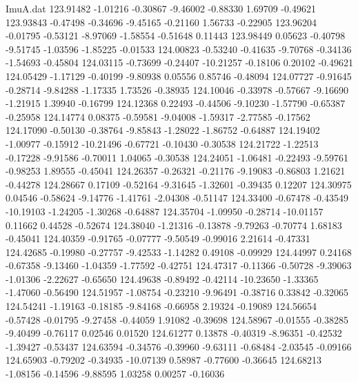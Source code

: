 \begin{filecontents}{ImuA.dat}
 123.91482   -1.01216   -0.30867   -9.46002   -0.88330    1.69709   -0.49621
 123.93843   -0.47498   -0.34696   -9.45165   -0.21160    1.56733   -0.22905
 123.96204   -0.01795   -0.53121   -8.97069   -1.58554   -0.51648    0.11443
 123.98449    0.05623   -0.40798   -9.51745   -1.03596   -1.85225   -0.01533
 124.00823   -0.53240   -0.41635   -9.70768   -0.34136   -1.54693   -0.45804
 124.03115   -0.73699   -0.24407  -10.21257   -0.18106    0.20102   -0.49621
 124.05429   -1.17129   -0.40199   -9.80938    0.05556    0.85746   -0.48094
 124.07727   -0.91645   -0.28714   -9.84288   -1.17335    1.73526   -0.38935
 124.10046   -0.33978   -0.57667   -9.16690   -1.21915    1.39940   -0.16799
 124.12368    0.22493   -0.44506   -9.10230   -1.57790   -0.65387   -0.25958
 124.14774    0.08375   -0.59581   -9.04008   -1.59317   -2.77585   -0.17562
 124.17090   -0.50130   -0.38764   -9.85843   -1.28022   -1.86752   -0.64887
 124.19402   -1.00977   -0.15912  -10.21496   -0.67721   -0.10430   -0.30538
 124.21722   -1.22513   -0.17228   -9.91586   -0.70011    1.04065   -0.30538
 124.24051   -1.06481   -0.22493   -9.59761   -0.98253    1.89555   -0.45041
 124.26357   -0.26321   -0.21176   -9.19083   -0.86803    1.21621   -0.44278
 124.28667    0.17109   -0.52164   -9.31645   -1.32601   -0.39435    0.12207
 124.30975    0.04546   -0.58624   -9.14776   -1.41761   -2.04308   -0.51147
 124.33400   -0.67478   -0.43549  -10.19103   -1.24205   -1.30268   -0.64887
 124.35704   -1.09950   -0.28714  -10.01157    0.11662    0.44528   -0.52674
 124.38040   -1.21316   -0.13878   -9.79263   -0.70774    1.68183   -0.45041
 124.40359   -0.91765   -0.07777   -9.50549   -0.99016    2.21614   -0.47331
 124.42685   -0.19980   -0.27757   -9.42533   -1.14282    0.49108   -0.09929
 124.44997    0.24168   -0.67358   -9.13460   -1.04359   -1.77592   -0.42751
 124.47317   -0.11366   -0.50728   -9.39063   -1.01306   -2.22627   -0.65650
 124.49638   -0.89492   -0.42114  -10.23650   -1.33365   -1.47060   -0.56490
 124.51957   -1.08754   -0.23210   -9.96491   -0.38716    0.33842   -0.32065
 124.54241   -1.19163   -0.18185   -9.84168   -0.66958    2.19324   -0.19089
 124.56654   -0.57428   -0.01795   -9.27458   -0.44059    1.91082   -0.39698
 124.58967   -0.01555   -0.38285   -9.40499   -0.76117    0.02546    0.01520
 124.61277    0.13878   -0.40319   -8.96351   -0.42532   -1.39427   -0.53437
 124.63594   -0.34576   -0.39960   -9.63111   -0.68484   -2.03545   -0.09166
 124.65903   -0.79202   -0.34935  -10.07139    0.58987   -0.77600   -0.36645
 124.68213   -1.08156   -0.14596   -9.88595    1.03258    0.00257   -0.16036

\end{filecontents}

